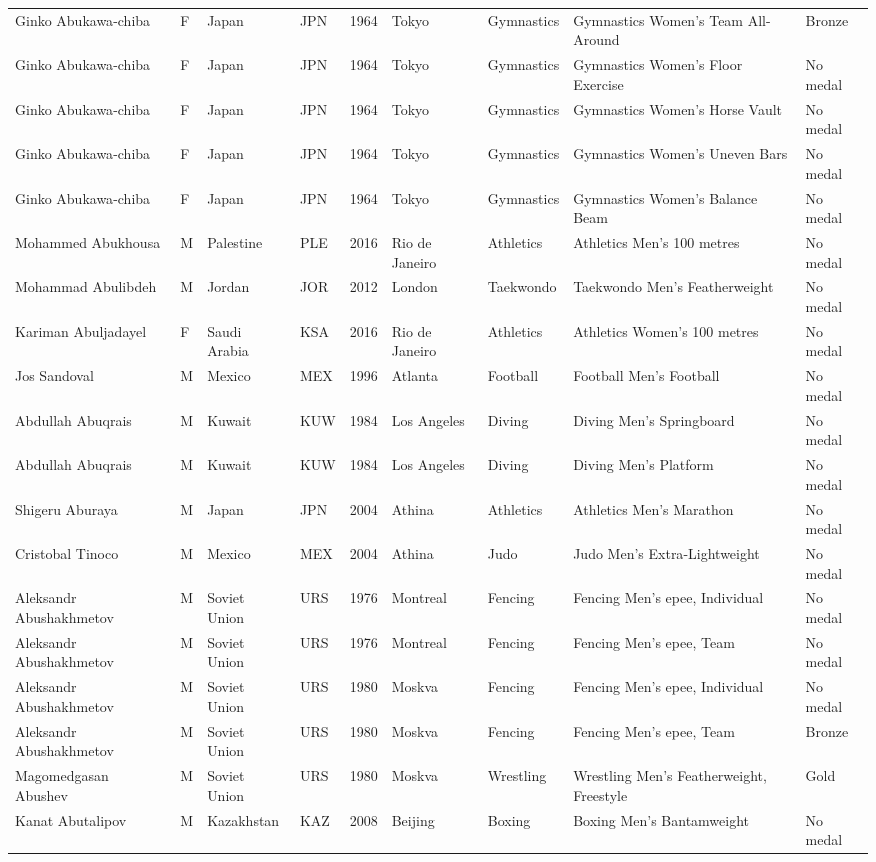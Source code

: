 \documentclass{article}%
\begin{document}
\begin{longtable}{p{1.5cm} p{0.5cm} p{2cm} p{1cm} p{1cm} p{1.5cm} p{1.5cm} p{5cm} p{1.5cm}}
Ginko Abukawa{-}chiba&F&Japan&JPN&1964&Tokyo&Gymnastics&Gymnastics Women's Team All{-}Around&Bronze\\%
Ginko Abukawa{-}chiba&F&Japan&JPN&1964&Tokyo&Gymnastics&Gymnastics Women's Floor Exercise&No medal\\%
Ginko Abukawa{-}chiba&F&Japan&JPN&1964&Tokyo&Gymnastics&Gymnastics Women's Horse Vault&No medal\\%
Ginko Abukawa{-}chiba&F&Japan&JPN&1964&Tokyo&Gymnastics&Gymnastics Women's Uneven Bars&No medal\\%
Ginko Abukawa{-}chiba&F&Japan&JPN&1964&Tokyo&Gymnastics&Gymnastics Women's Balance Beam&No medal\\%
Mohammed Abukhousa&M&Palestine&PLE&2016&Rio de Janeiro&Athletics&Athletics Men's 100 metres&No medal\\%
Mohammad Abulibdeh&M&Jordan&JOR&2012&London&Taekwondo&Taekwondo Men's Featherweight&No medal\\%
Kariman Abuljadayel&F&Saudi Arabia&KSA&2016&Rio de Janeiro&Athletics&Athletics Women's 100 metres&No medal\\%
Jos Sandoval&M&Mexico&MEX&1996&Atlanta&Football&Football Men's Football&No medal\\%
Abdullah Abuqrais&M&Kuwait&KUW&1984&Los Angeles&Diving&Diving Men's Springboard&No medal\\%
Abdullah Abuqrais&M&Kuwait&KUW&1984&Los Angeles&Diving&Diving Men's Platform&No medal\\%
Shigeru Aburaya&M&Japan&JPN&2004&Athina&Athletics&Athletics Men's Marathon&No medal\\%
Cristobal Tinoco&M&Mexico&MEX&2004&Athina&Judo&Judo Men's Extra{-}Lightweight&No medal\\%
Aleksandr Abushakhmetov&M&Soviet Union&URS&1976&Montreal&Fencing&Fencing Men's epee, Individual&No medal\\%
Aleksandr Abushakhmetov&M&Soviet Union&URS&1976&Montreal&Fencing&Fencing Men's epee, Team&No medal\\%
Aleksandr Abushakhmetov&M&Soviet Union&URS&1980&Moskva&Fencing&Fencing Men's epee, Individual&No medal\\%
Aleksandr Abushakhmetov&M&Soviet Union&URS&1980&Moskva&Fencing&Fencing Men's epee, Team&Bronze\\%
Magomedgasan Abushev&M&Soviet Union&URS&1980&Moskva&Wrestling&Wrestling Men's Featherweight, Freestyle&Gold\\%
Kanat Abutalipov&M&Kazakhstan&KAZ&2008&Beijing&Boxing&Boxing Men's Bantamweight&No medal\\%

\end{longtable}
\end{document}
